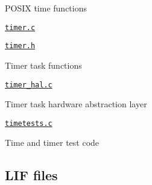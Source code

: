 \begin{DoxyItemize}
\begin{DoxyItemize}
\begin{DoxyItemize}
\item P\+O\+S\+IX time functions
\end{DoxyItemize}
\item \href{lib/timer.c}{\tt timer.\+c}
\item \href{lib/timer.h}{\tt timer.\+h}
\begin{DoxyItemize}
\item Timer task functions
\end{DoxyItemize}
\item \href{lib/timer_hal.c}{\tt timer\+\_\+hal.\+c}
\begin{DoxyItemize}
\item Timer task hardware abstraction layer
\end{DoxyItemize}
\item \href{lib/timetests.c}{\tt timetests.\+c}
\begin{DoxyItemize}
\item Time and timer test code
\end{DoxyItemize}
\end{DoxyItemize}
\end{DoxyItemize}

\subsection*{L\+IF files}


